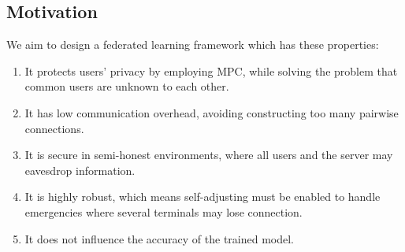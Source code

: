 
\subsection{Motivation} We aim to design a federated learning framework which has these properties:
\begin{enumerate}
    \item It protects users' privacy by employing MPC, while solving the problem that common users are unknown to each other.

    \item It has low communication overhead, avoiding constructing too many pairwise connections.

    \item It is secure in semi-honest environments, where all users and the server may eavesdrop information.

    \item It is highly robust, which means self-adjusting must be enabled to handle emergencies where several terminals may lose connection.

    \item It does not influence the accuracy of the trained model.
\end{enumerate}

